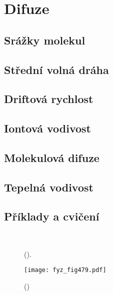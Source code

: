 \setchaptertoc
\chapter{Difuze}\label{fyz:IchapXLIII}

  \section{Srážky molekul}\label{fyz:IchapXLIIIsecI}
  \section{Střední volná dráha}\label{fyz:IchapXLIIIsecII}
  \section{Driftová rychlost}\label{fyz:IchapXLIIIsecIII}
  \section{Iontová vodivost}\label{fyz:IchapXLIIIsecIV}
  \section{Molekulová difuze}\label{fyz:IchapXLIIIsecV}
  \section{Tepelná vodivost}\label{fyz:IchapXLIIIsecVI}
  \section{Příklady a cvičení}\label{fyz:IchapXLIIIsecVII}

  \begin{figure}[hb!] %
    \centering
      \\
    \caption{
             (\cite[s.~601]{Feynman01}).}
    \label{fyz:fig478}
  \end{figure}

    \begin{figure}[ht!] %
      \centering
      \texttt{[image: fyz\_fig479.pdf]}
      \caption{ 
               (\cite[s.~707]{Feynman01})}
      \label{fyz:fig479}
    \end{figure}
